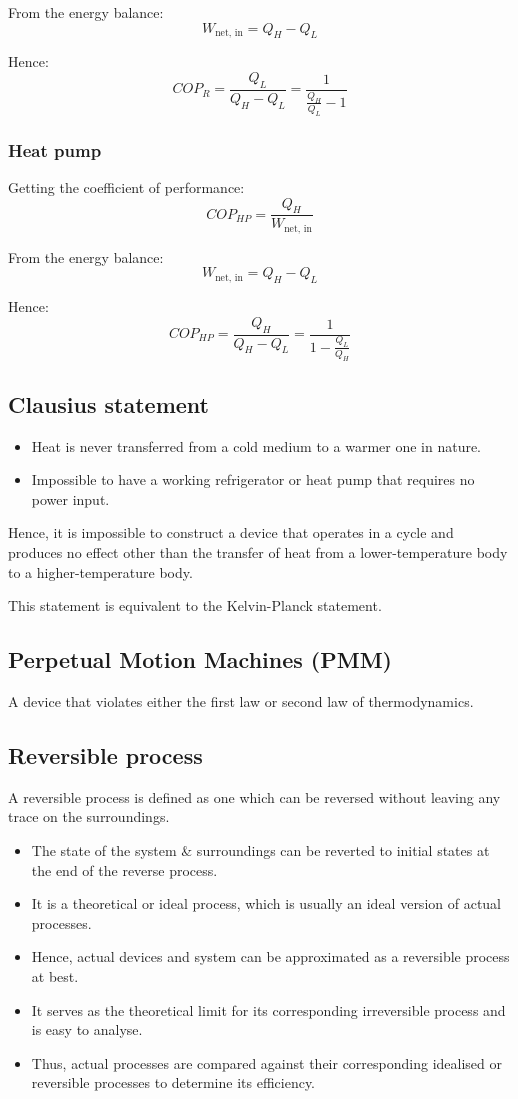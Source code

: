 \documentclass[11pt]{article}
\begin{document}
From the energy balance:
\[W_{\text{net, in}} = Q_H - Q_L\]

Hence:
\[COP_R = \frac{Q_L}{Q_H - Q_L} = \frac{1}{\frac{Q_H}{Q_L} - 1}\]
\subsubsection{Heat pump}
\label{sec:orgc852cbe}
Getting the coefficient of performance:
\[COP_{HP} = \frac{Q_H}{W_{\text{net, in}}}\]

From the energy balance:
\[W_{\text{net, in}} = Q_H - Q_L\]

Hence:
\[COP_{HP} = \frac{Q_H}{Q_H - Q_L} = \frac{1}{1 - \frac{Q_L}{Q_H}}\]
\subsection{Clausius statement}
\label{sec:org4bd76ba}
\begin{itemize}
\item Heat is never transferred from a cold medium to a warmer one in nature.
\item Impossible to have a working refrigerator or heat pump that requires no power input.
\end{itemize}

Hence, it is impossible to construct a device that operates in a cycle and produces no effect other than the transfer of heat from a lower-temperature body to a higher-temperature body.


This statement is equivalent to the Kelvin-Planck statement.
\subsection{Perpetual Motion Machines (PMM)}
\label{sec:orgc938ac5}
A device that violates either the first law or second law of thermodynamics.
\subsection{Reversible process}
\label{sec:orga3218a0}
A reversible process is defined as one which can be reversed without leaving any trace on the surroundings.
\begin{itemize}
\item The state of the system \& surroundings can be reverted to initial states at the end of the reverse process.
\item It is a theoretical or ideal process, which is usually an ideal version of actual processes.
\item Hence, actual devices and system can be approximated as a reversible process at best.
\item It serves as the theoretical limit for its corresponding irreversible process and is easy to analyse.
\item Thus, actual processes are compared against their corresponding idealised or reversible processes to determine its efficiency.
\end{itemize}
\end{document}
